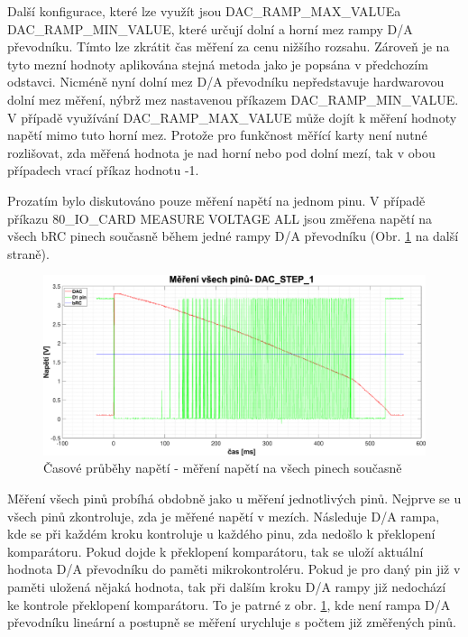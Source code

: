 Další konfigurace, které lze využít jsou DAC\_RAMP\_MAX\_VALUE\linebreak a DAC\_RAMP\_MIN\_VALUE,
které určují dolní a horní mez rampy D/A převodníku. Tímto lze zkrátit čas měření za cenu nižšího rozsahu.
Zároveň je na tyto mezní hodnoty aplikována stejná metoda jako je popsána v předchozím odstavci.
Nicméně nyní dolní mez D/A převodníku nepředstavuje hardwarovou dolní mez měření,
nýbrž mez nastavenou příkazem DAC\_RAMP\_MIN\_VALUE.
V případě využívání DAC\_RAMP\_MAX\_VALUE může dojít k měření hodnoty napětí mimo tuto horní mez. Protože pro funkčnost měřící karty není
nutné rozlišovat, zda měřená hodnota je nad horní nebo pod dolní mezí, tak v obou případech vrací příkaz hodnotu -1.\par 

Prozatím bylo diskutováno pouze měření napětí na jednom pinu.
V případě \linebreak příkazu 80\_IO\_CARD MEASURE VOLTAGE ALL jsou změřena napětí na všech bRC pinech současně během jedné rampy
D/A převodníku (Obr. \ref{fig: bRC pin voltage measurement allpins} na další straně).

\clearpage
\begin{figure}[ht!]
    \centering
    \includegraphics[width = 1\textwidth]{obrazky/matlab_generated/all_pins.eps}
    \caption{Časové průběhy napětí - měření napětí na všech pinech současně}
    \label{fig: bRC pin voltage measurement allpins}
\end{figure}

Měření všech pinů probíhá obdobně jako u měření jednotlivých pinů. Nejprve se u všech pinů zkontroluje, zda je měřené napětí v mezích.
Následuje D/A rampa, kde se při každém kroku kontroluje u každého pinu, zda nedošlo k překlopení komparátoru. Pokud dojde k překlopení komparátoru,
tak se uloží aktuální hodnota D/A převodníku do paměti mikrokontroléru. Pokud je pro daný pin již v paměti uložená nějaká hodnota, tak při dalším
kroku D/A rampy již nedochází ke kontrole překlopení komparátoru. To je patrné z obr. \ref{fig: bRC pin voltage measurement allpins}, kde není rampa
D/A převodníku lineární a postupně se měření urychluje s počtem již změřených pinů.\par 

